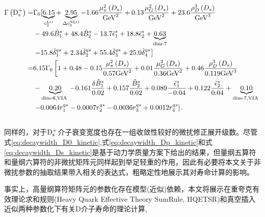         \begin{equation}
            \begin{aligned}
            \Gamma\left(\mathrm{D_s^{+}}\right)= & \Gamma_0[\underbrace{6.15}_{c_3^{\mathrm{LO}}}+\underbrace{2.95}_{\Delta c_3^{\mathrm{NLO}}}-1.66 \frac{\mu_\pi^2\left(D_s\right)}{\mathrm{GeV}^2}+0.13 \frac{\mu_G^2\left(D_s\right)}{\mathrm{GeV}^2}+23.6 \frac{\rho_D^3\left(D_s\right)}{\mathrm{GeV}^3} \\
            & -49.6 \tilde{B}_1^s+48.4 \tilde{B}_2^s-13.7 \tilde{\epsilon}_1^s+18.8 \tilde{\epsilon}_2^s+\underbrace{0.63}_{\operatorname{dim-7}} \\
            & \left.-15.8 \tilde{\delta}_1^{q s}+2.34 \tilde{\delta}_2^{q s}+55.4 \tilde{\delta}_3^{q s}+25.0 \tilde{\delta}_4^{q s}\right] \\
            = & 6.15 \Gamma_0\left[1+0.48-0.15 \frac{\mu_\pi^2\left(D_s\right)}{0.57 \mathrm{GeV}^2}+0.01 \frac{\mu_G^2\left(D_s\right)}{0.36 \mathrm{GeV}^2}+0.46 \frac{\rho_D^3\left(D_s\right)}{0.119 \mathrm{GeV}^3}\right. \\
            & -\underbrace{0.20}_{\text {dim-6,VIA }}-0.161 \frac{\delta \tilde{B}_1^s}{0.02}+0.157 \frac{\tilde{B}_2^s}{0.02}+0.089 \frac{\tilde{\epsilon}_1^s}{-0.04}+0.122 \frac{\tilde{\epsilon}_2^s}{0.04}+\underbrace{0.10}_{\text {dim-7,VIA }} \\
            & \left.-0.0064 r_1^{q s}-0.0007 r_2^{q s}-0.0036 r_3^{q s}+0.0012 r_4^{q s}\right]. \\
            &
            \end{aligned}
            \label{eq:decaywidth_Ds_kinetic}
            \end{equation}
        同样的，对于$\mathrm{D_s^+}$介子衰变宽度也存在一组收敛性较好的微扰修正展开级数。尽管式\eqref{eq:decaywidth_D0_kinetic},式\eqref{eq:decaywidth_Dp_kinetic}和式\eqref{eq:decaywidth_Ds_kinetic}是基于动力学质量方案下给出的结果，但量纲五算符和量纲六算符的非微扰矩阵元同样起到举足轻重的作用，因此有必要将本文关于非微扰参数的抽取结果带入相关的表达式，粗略定性地展示其对寿命计算的影响。

        事实上，高量纲算符矩阵元的参数化存在模型(近似)依赖，本文将展示在重夸克有效理论求和规则(Heavy Quark Effective Theory SumRule, HQETSR)和真空插入近似两种参数化下有关D介子寿命的理论计算,
        
